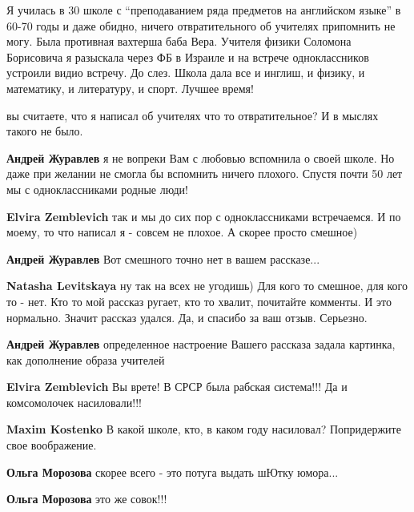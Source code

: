 \begin{itemize}
\begin{itemize}
\end{itemize} %


Я училась в 30 школе с \enquote{преподаванием ряда предметов на английском языке} в
60-70 годы и даже обидно, ничего отвратительного об учителях припомнить не
могу. Была противная вахтерша баба Вера. Учителя физики Соломона Борисовича я
разыскала через ФБ в Израиле и на встрече одноклассников устроили видио
встречу. До слез. Школа дала все и инглиш, и физику, и математику, и
литературу, и спорт. Лучшее время!

\begin{itemize} %
вы считаете, что я написал об учителях что то отвратительное? И в мыслях такого не было.

\begin{itemize} %
\textbf{Андрей Журавлев} я не вопреки Вам с любовью вспомнила о своей школе. Но даже при желании не смогла бы вспомнить ничего плохого. Спустя почти 50 лет мы с одноклассниками родные люди!

\textbf{Elvira Zemblevich} так и мы до сих пор с одноклассниками встречаемся. И по моему, то что написал я - совсем не плохое. А скорее просто смешное)

\textbf{Андрей Журавлев}
Вот смешного точно нет в вашем рассказе...

\textbf{Natasha Levitskaya} ну так на всех не угодишь) Для кого то смешное, для кого то - нет. Кто то мой рассказ ругает, кто то хвалит, почитайте комменты. И это нормально. Значит рассказ удался. Да, и спасибо за ваш отзыв. Серьезно.

\textbf{Андрей Журавлев} определенное настроение Вашего рассказа задала картинка, как дополнение образа учителей
\end{itemize} %

\textbf{Elvira Zemblevich} Вы врете!
В СРСР была рабская система!!!
Да и комсомолочек насиловали!!!

\begin{itemize} %
\textbf{Maxim Kostenko} В какой школе, кто, в каком году насиловал? Попридержите свое воображение.

\textbf{Ольга Морозова} скорее всего - это потуга выдать шЮтку юмора...

\textbf{Ольга Морозова} это же совок!!!


\end{itemize}
\end{itemize}
\end{itemize}
